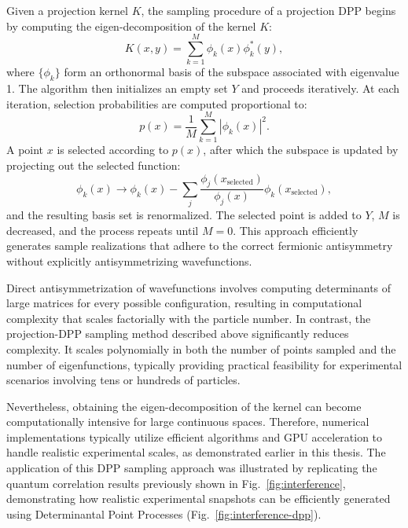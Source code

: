 
Given a projection kernel $K$, the sampling procedure of a projection DPP begins by computing the eigen-decomposition of the kernel $K$:
\begin{equation}
K(x,y) = \sum_{k=1}^{M} \phi_k(x)\phi_k^*(y),
\end{equation}
where $\{\phi_k\}$ form an orthonormal basis of the subspace associated with eigenvalue 1.
The algorithm then initializes an empty set $Y$ and proceeds iteratively. At each iteration, selection probabilities are computed proportional to:
\begin{equation}
p(x) = \frac{1}{M} \sum_{k=1}^{M} |\phi_k(x)|^2.
\end{equation}
A point $x$ is selected according to $p(x)$, after which the subspace is updated by projecting out the selected function:
\begin{equation}
\phi_k(x) \rightarrow \phi_k(x) - \sum_j \frac{\phi_j(x_{\text{selected}})}{\phi_j(x)} \phi_k(x_{\text{selected}}),
\end{equation}
and the resulting basis set is renormalized. The selected point is added to $Y$, $M$ is decreased, and the process repeats until $M = 0$. This approach efficiently generates sample realizations that adhere to the correct fermionic antisymmetry without explicitly antisymmetrizing wavefunctions.


Direct antisymmetrization of wavefunctions involves computing determinants of large matrices for every possible configuration, resulting in computational complexity that scales factorially with the particle number. In contrast, the projection-DPP sampling method described above significantly reduces complexity. It scales polynomially in both the number of points sampled and the number of eigenfunctions, typically providing practical feasibility for experimental scenarios involving tens or hundreds of particles.

Nevertheless, obtaining the eigen-decomposition of the kernel can become computationally intensive for large continuous spaces. Therefore, numerical implementations typically utilize efficient algorithms and GPU acceleration to handle realistic experimental scales, as demonstrated earlier in this thesis. The application of this DPP sampling approach was illustrated by replicating the quantum correlation results previously shown in Fig.~\ref{fig:interference}, demonstrating how realistic experimental snapshots can be efficiently generated using Determinantal Point Processes (Fig.~\ref{fig:interference-dpp}).

